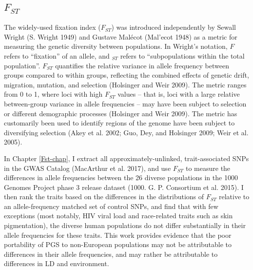 \documentclass[
]{book}
\begin{document}
\hypertarget{Fst-descr}{%
\subsection{\texorpdfstring{\(F_{ST}\)}{F\_\{ST\}}}\label{Fst-descr}}

The widely-used fixation index (\(F_{ST}\)) was introduced independently by Sewall Wright (S. Wright 1949) and Gustave Malécot (Mal'ecot 1948) as a metric for measuring the genetic diversity between populations. In Wright's notation, \(F\) refers to ``fixation'' of an allele, and \(_{ST}\) refers to ``subpopulations within the total population''. \(F_{ST}\) quantifies the relative variance in allele frequency between groups compared to within groups, reflecting the combined effects of genetic drift, migration, mutation, and selection (Holsinger and Weir 2009). The metric ranges from 0 to 1, where loci with high \(F_{ST}\) values -- that is, loci with a large relative between-group variance in allele frequencies -- may have been subject to selection or different demographic processes (Holsinger and Weir 2009). The metric has customarily been used to identify regions of the genome have been subject to diversifying selection (Akey et al. 2002; Guo, Dey, and Holsinger 2009; Weir et al. 2005).

In Chapter \ref{Fst-chap}, I extract all approximately-unlinked, trait-associated SNPs in the GWAS Catalog (MacArthur et al. 2017), and use \(F_{ST}\) to measure the differences in allele frequencies between the 26 diverse populations in the 1000 Genomes Project phase 3 release dataset (1000. G. P. Consortium et al. 2015). I then rank the traits based on the differences in the distributions of \(F_{ST}\) relative to an allele-frequency matched set of control SNPs, and find that with few exceptions (most notably, HIV viral load and race-related traits such as skin pigmentation), the diverse human populations do not differ substantially in their allele frequencies for these traits. This work provides evidence that the poor portability of PGS to non-European populations may not be attributable to differences in their allele frequencies, and may rather be attributable to differences in LD and environment.
\end{document}
